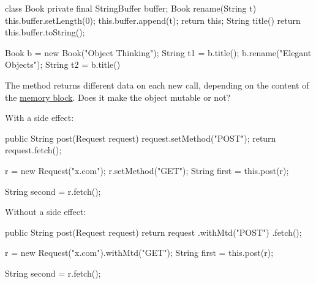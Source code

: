 \documentclass{article}
\begin{document}
\begin{pptWide}{2}
{\small\begin{ffcode}
class Book {
  private final StringBuffer buffer;
  Book rename(String t) {
    this.buffer.setLength(0);
    this.buffer.append(t);
    return this;
  }
  String title() {
    return this.buffer.toString();
  }
}
\end{ffcode}
}
\par\columnbreak\par
{\small\begin{ffcode}
Book b = new Book("Object Thinking");
String t1 = b.title();
b.rename("Elegant Objects");
String t2 = b.title()
\end{ffcode}
}
\par
The  method returns different data on each new call,
depending on the content of the \ul{memory block}.
Does it make the object mutable or not?
\end{pptWide}
\par
\plush{}



\begin{pptWide}{2}
With a side effect:\par
{\small\begin{ffcode}
public String post(Request request) {
  request.setMethod("POST");
  return request.fetch();
}

r = new Request("x.com");
r.setMethod("GET");
String first = this.post(r);

String second = r.fetch();
\end{ffcode}
}
\par\columnbreak\par
Without a side effect:\par
{\small\begin{ffcode}
public String post(Request request) {
  return request
    .withMtd("POST")
    .fetch();
}

r = new Request("x.com").withMtd("GET");
String first = this.post(r);

String second = r.fetch();
\end{ffcode}
}
\end{pptWide}
\par
\plush{}
\end{document}
